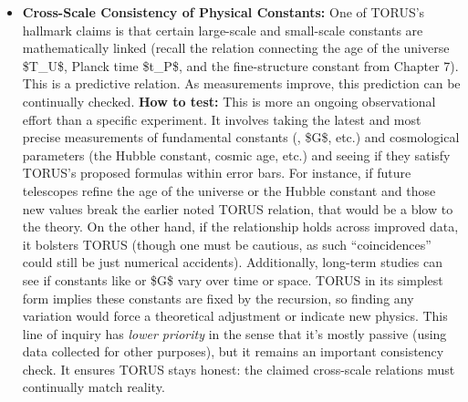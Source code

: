 \documentclass[
]{article}
\begin{document}
{\begin{itemize}
  solar system (just hypothetically, if some recursion effect tied to a
  cosmic frame), it would be revolutionary. Absent such discoveries,
  pushing these bounds simply tightens the possible space for TORUS's
  parameters that affect vacuum physics.
\item
  \textbf{Cross-Scale Consistency of Physical Constants:} One of TORUS's
  hallmark claims is that certain large-scale and small-scale constants
  are mathematically linked (recall the relation connecting the age of
  the universe \$T\_U\$, Planck time \$t\_P\$, and the fine-structure
  constant \alpha from Chapter 7). This is a predictive relation. As
  measurements improve, this prediction can be continually checked.
  \textbf{How to test:} This is more an ongoing observational effort
  than a specific experiment. It involves taking the latest and most
  precise measurements of fundamental constants (\alpha, \$G\$, etc.) and
  cosmological parameters (the Hubble constant, cosmic age, etc.) and
  seeing if they satisfy TORUS's proposed formulas within error
  bars\hspace{0pt}. For instance, if future telescopes refine the age of
  the universe or the Hubble constant and those new values break the
  earlier noted TORUS relation, that would be a blow to the theory. On
  the other hand, if the relationship holds across improved data, it
  bolsters TORUS (though one must be cautious, as such ``coincidences''
  could still be just numerical accidents). Additionally, long-term
  studies can see if constants like \alpha or \$G\$ vary over time or space.
  TORUS in its simplest form implies these constants are fixed by the
  recursion, so finding any variation would force a theoretical
  adjustment or indicate new physics. This line of inquiry has
  \emph{lower priority} in the sense that it's mostly passive (using
  data collected for other purposes)\hspace{0pt}, but it remains an
  important consistency check. It ensures TORUS stays honest: the
  claimed cross-scale relations must continually match reality.
\end{itemize}

}
\end{document}
